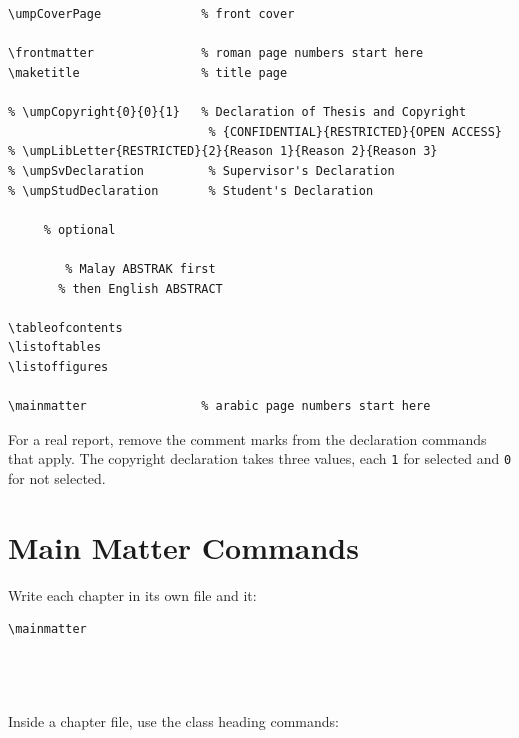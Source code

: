 \begin{verbatim}


\umpCoverPage              % front cover

\frontmatter               % roman page numbers start here
\maketitle                 % title page

% \umpCopyright{0}{0}{1}   % Declaration of Thesis and Copyright
                            % {CONFIDENTIAL}{RESTRICTED}{OPEN ACCESS}
% \umpLibLetter{RESTRICTED}{2}{Reason 1}{Reason 2}{Reason 3}
% \umpSvDeclaration         % Supervisor's Declaration
% \umpStudDeclaration       % Student's Declaration

     % optional

        % Malay ABSTRAK first
       % then English ABSTRACT

\tableofcontents
\listoftables
\listoffigures

\mainmatter                % arabic page numbers start here
\end{verbatim}

For a real report, remove the comment marks from the declaration commands that apply. The copyright declaration takes three values, each \texttt{1} for selected and \texttt{0} for not selected.

\section{Main Matter Commands}

Write each chapter in its own file and \texttt{\string} it:

\begin{verbatim}
\mainmatter




\end{verbatim}

Inside a chapter file, use the class heading commands:


